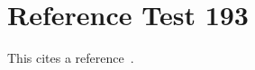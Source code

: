 \documentclass{article}
\begin{document}
\section{Reference Test 193}
This cites a reference~\cite{test193}.

\end{document}
